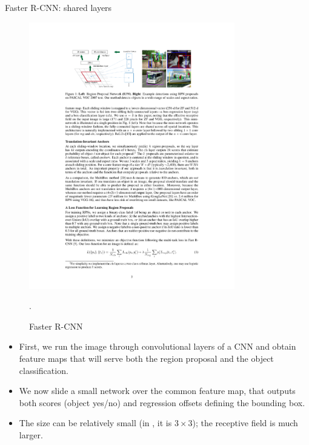 \documentclass[xcolor=pdftex,dvipsnames,table]{beamer}
\begin{document}
\begin{frame}{Faster R-CNN: shared layers}
\begin{figure}[htb]
   \centering
   \includegraphics[width=0.8\textwidth]{../graphics/Faster_R-CNN.pdf}
   \caption{Faster R-CNN \cite{Ren2017}}.
\end{figure}
\begin{itemize}
\item First, we run the image through convolutional layers of a CNN and obtain feature maps that will serve both the region proposal and the object classification. 
\item We now slide a small network over the common feature map, that outputs both scores (object yes/no) and regression offsets defining the bounding box. 
\item The size can be relatively small (in \cite{Ren2017}, it is $3 \times 3$); the receptive field is much larger. 
\end{itemize}
\end{frame}
\end{document}
